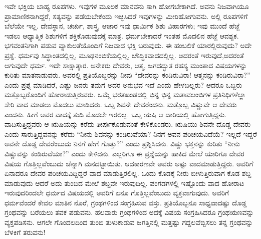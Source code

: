 ಇವೇ ಭಕ್ತಿಯ ಬಾಹ್ಯ ರೂಪಗಳು. ಇವುಗಳ ಮೂಲಕ ಮಾನವನು ಸಾಗಿ ಹೋಗಬೇಕಾಗಿದೆ. ಅವನು ನಿಜವಾಗಿಯೂ ಪ್ರಾಮಾಣಿಕನಾಗಿದ್ದರೆ, ಸತ್ಯವನ್ನು ಪಡೆಯಬೇಕೆಂದು ಇಚ್ಛಿಸಿದರೆ ಇವುಗಳನ್ನು ಮೀರಿಹೋಗುವನು. ಅಲ್ಲಿ ರೂಪಗಳಿಗೆ ಬೆಲೆಯೇ ಇಲ್ಲ. ದೇವಸ್ಥಾನ, ಚರ್ಚು, ಶಾಸ್ತ್ರ, ಆಚಾರ ಇವು ಧಾರ್ಮಿಕ ಶಿಶು ವಿಹಾರಗಳು; ಇವು ಮುಂದೆ ಹೆಜ್ಜೆ ಇಡಲು ಆಧ್ಯಾತ್ಮಿಕ ಶಿಶುಗಳಿಗೆ ಶಕ್ತಿಕೊಡುವುದಕ್ಕೆ ಮಾತ್ರ. ಧರ್ಮಬೇಕಾದರೆ ಇಂತಹ ಮೊದಲಿನ ಹೆಜ್ಜೆ ಆವಶ್ಯಕ. ಭಗವಂತನಿಗಾಗಿ ಪಡುವ ವ್ಯಾಕುಲತೆಯೊಂದಿಗೆ ನಿಜವಾದ ಭಕ್ತಿ ಬರುವುದು. ಈ ಹಂಬಲಿಕೆ ಯಾರಲ್ಲಿರುವುದು? ಅದೇ ಪ್ರಶ್ನೆ. ಧರ್ಮವು ಸಿದ್ಧಾಂತದಲ್ಲಿಲ್ಲ, ಮೂಢನಂಬಿಕೆಯಲ್ಲಿಲ್ಲ, ಬೌದ್ಧಿಕವಾದದಲ್ಲಿಲ್ಲ. ಅದರಂತೆ ಇರುವುದೆ,\break ಅದರಂತೆ ಆಗುವುದೇ ಧರ್ಮ. ಇದೇ ಸಾಕ್ಷಾತ್ಕಾರ. ಅನೇಕರು ದೇವರು, ಆತ್ಮ, ಜಗದದ್ಭುತ ರಹಸ್ಯ ಮುಂತಾದ ವಿಷಯಗಳನ್ನು ಕುರಿತು ಮಾತನಾಡುವರು. ಅವರಲ್ಲಿ ಪ್ರತಿಯೊಬ್ಬರನ್ನು ನೀವು “ದೇವರನ್ನು ಕಂಡಿರುವಿರಾ! ಆತ್ಮನನ್ನು ಕಂಡಿರುವಿರಾ?” ಎಂದು ಪ್ರಶ್ನೆ ಮಾಡಿದರೆ, ಎಷ್ಟು ಜನರು ತಮಗೆ ಅದರ ಅನುಭವ ಇದೆ ಎಂದು ಹೇಳಬಲ್ಲರು? ಆದರೂ ಒಬ್ಬರು ಮತ್ತೊಬ್ಬರೊಂದಿಗೆ ಹೋರಾಡುತ್ತಿರುವರು. ಒಮ್ಮೆ ಭರತಖಂಡದಲ್ಲಿ ಭಿನ್ನ ಭಿನ್ನ ಮತಾವಲಂಬಿಗಳ ಪ್ರತಿನಿಧಿಗಳೆಲ್ಲಾ ಸೇರಿ ವಾದ ಮಾಡಲು ಮೊದಲು ಮಾಡಿದರು. ಒಬ್ಬ ಶಿವನೇ ದೇವರೆಂದನು. ಮತ್ತೊಬ್ಬ ವಿಷ್ಣುವೇ ಆ ದೇವರು ಎಂದನು. ಹೀಗೆ ಅವರ ವಾದಕ್ಕೆ ತುದಿ ಮೊದಲೇ ಇರಲಿಲ್ಲ. ಒಬ್ಬ ಋಷಿ ಆ ದಾರಿಯಲ್ಲಿ ಹೋಗುತ್ತಿದ್ದನು. ವಾದಿಸುತ್ತಿದ್ದವರು ಆ ಋಷಿಯನ್ನು ಕರೆದು ತೀರ್ಪುಕೊಡುವಂತೆ ಕೇಳಿಕೊಂಡರು. ಋಷಿಯು ಶಿವನೇ ದೊಡ್ಡ ದೇವರು ಎಂದು ಸಾರುತ್ತಿದ್ದವನನ್ನು ಕರೆದು “ನೀನು ಶಿವನನ್ನು ಕಂಡಿರುವೆಯಾ? ನಿನಗೆ ಅವನ ಪರಿಚಯವಿದೆಯೆ? ಇಲ್ಲದೆ ಇದ್ದರೆ ಅವನೇ ದೊಡ್ಡ ದೇವರೆಂಬುದು ನಿನಗೆ ಹೇಗೆ ಗೊತ್ತು?” ಎಂದು ಪ್ರಶ್ನಿಸಿದನು. ವಿಷ್ಣು ಭಕ್ತನನ್ನು ಕುರಿತು “ನೀನು ವಿಷ್ಣುವನ್ನು ಕಂಡಿರುವೆಯಾ?” ಎಂದು ಕೇಳಿದನು. ಎಲ್ಲರಿಗೂ ಈ ಪ್ರಶ್ನೆಯನ್ನು ಹಾಕಿದ ಮೇಲೆ ಯಾರಿಗೂ ದೇವರ ವಿಷಯ ಗೊತ್ತಿಲ್ಲವೆಂಬುದು ಚೆನ್ನಾಗಿ ಮನದಟ್ಟಾಯಿತು. ಆದ\-ಕಾರಣವೇ ಅವರು ಅಷ್ಟು ವಾದಮಾಡುತ್ತಿದ್ದರು. ಅವರಿಗೆ ಏನಾದರೂ ದೇವರ ಪರಿಚಯವಿದ್ದಿದ್ದರೆ ವಾದ ಮಾಡುತ್ತಿರಲಿಲ್ಲ. ಒಂದು ಕೊಡಕ್ಕೆ ನೀರು ಬೀಳುತ್ತಿರುವಾಗ ಕೊಡ ಶಬ್ದ ಮಾಡುವುದು ಆದರೆ ಅದು ತುಂಬಿದ ಮೇಲೆ ಶಬ್ದವೇ ಇರುವುದಿಲ್ಲ. ಪಂಗಡಗಳಲ್ಲಿ ಇಷ್ಟೊಂದು ವಾದ ಹೋರಾಟ ಇರುವುದರಿಂದಲೇ ಧರ್ಮದ ವಿಷಯದಲ್ಲಿ ಅವರಿಗೆ ಏನೂ ಗೊತ್ತಿಲ್ಲವೆಂಬುದು ವ್ಯಕ್ತವಾಗುವುದು. ಅವರಿಗೆ ಧರ್ಮವೆಂದರೆ ಕೇವಲ ಮಾತಿನ ನೊರೆ, ಗ್ರಂಥಗಳಿಂದ ಸಂಗ್ರಹಿಸುವ ವಸ್ತು. ಪ್ರತಿಯೊಬ್ಬನೂ ಸಾಧ್ಯವಾದಷ್ಟು ದೊಡ್ಡ ಗ್ರಂಥವನ್ನು ಬರೆಯಲು ತವಕ ಪಡುವನು. ಹಲವಾರು ಗ್ರಂಥಗಳಿಂದ ಅದಕ್ಕೆ ವಿಷಯ ಸಂಗ್ರಹಿಸಿದರೂ ಗ್ರಂಥಋಣವನ್ನು ವ್ಯಕ್ತಪಡಿಸನು. ಆಗಲೇ ಗೊಂದಲದಿಂದ ತುಂಬಿ ತುಳುಕಾಡುವ ಜಗತ್ತಿನಲ್ಲಿ ಮತ್ತಷ್ಟು ಗದ್ದಲವೆಬ್ಬಿಸಲು ತನ್ನ ಗ್ರಂಥವನ್ನು ಬೆಳಕಿಗೆ ತರುವನು!

